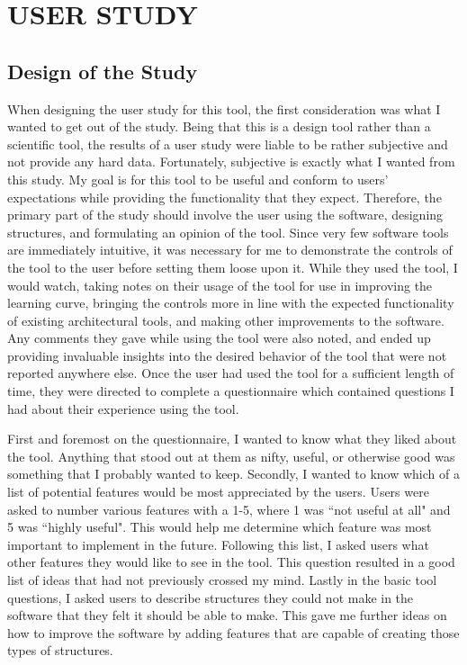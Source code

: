 \documentclass{thesis}
\begin{document}
\chapter{USER STUDY}
\section{Design of the Study}
When designing the user study for this tool, the first consideration was what I wanted to get out of the study.  Being that this is
a design tool rather than a scientific tool, the results of a user study were liable to be rather subjective and not provide any hard
data.  Fortunately, subjective is exactly what I wanted from this study.  My goal is for this tool to be useful and conform to users'
expectations while providing the functionality that they expect.  Therefore, the primary part of the study should involve the
user using the software, designing structures, and formulating an opinion of the tool.  Since very few software tools are immediately
intuitive, it was necessary for me to demonstrate the controls of the tool to the user before setting them loose upon it.  While they used
the tool, I would watch, taking notes on their usage of the tool for use in improving the learning curve, bringing the controls
more in line with the expected functionality of existing architectural tools, and making other improvements to the software.  Any
comments they gave while using the tool were also noted, and ended up providing invaluable insights into the desired behavior of the
tool that were not reported anywhere else.  Once the user had used the tool for a sufficient length of time, they were directed to
complete a questionnaire which contained questions I had about their experience using the tool.

First and foremost on the questionnaire, I wanted to know what they liked about the tool.  Anything that stood out at them as
nifty, useful, or otherwise good was something that I probably wanted to keep.  Secondly, I wanted to know which of a list
of potential features would be most appreciated by the users.  Users were asked to number various features with a 1-5, where
1 was ``not useful at all" and 5 was ``highly useful".  This would help me determine which feature was most important to
implement in the future.  Following this list, I asked users what other features they would like to see in the tool.  This
question resulted in a good list of ideas that had not previously crossed my mind.  Lastly in the basic tool questions, I
asked users to describe structures they could not make in the software that they felt it should be able to make.  This gave
me further ideas on how to improve the software by adding features that are capable of creating those types of structures.
\end{document}
